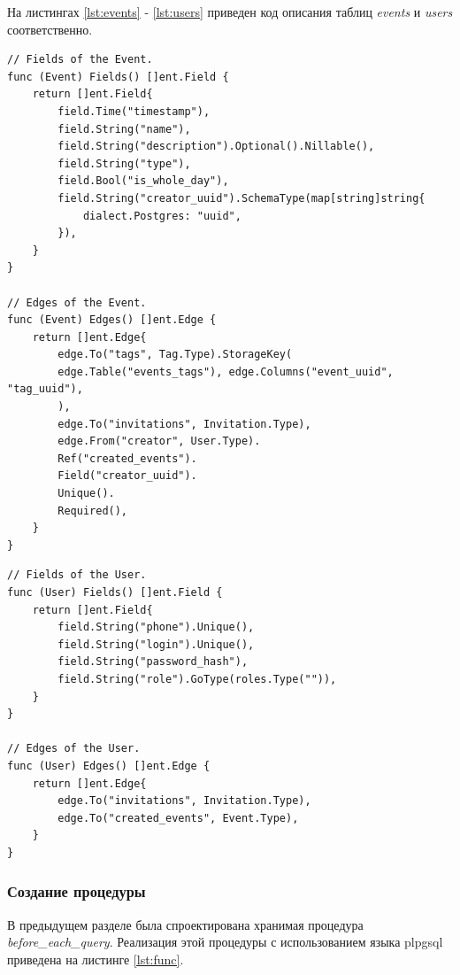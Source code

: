 На листингах \ref{lst:events} - \ref{lst:users} приведен код описания таблиц \textit{events} и \textit{users} соответственно.

\begin{center}
\captionsetup{justification=raggedright,singlelinecheck=off}
\begin{lstlisting}[label=lst:events,caption=Описание таблицы событий]
// Fields of the Event.
func (Event) Fields() []ent.Field {
	return []ent.Field{
		field.Time("timestamp"),
		field.String("name"),
		field.String("description").Optional().Nillable(),
		field.String("type"),
		field.Bool("is_whole_day"),
		field.String("creator_uuid").SchemaType(map[string]string{
			dialect.Postgres: "uuid",
		}),
	}
}

// Edges of the Event.
func (Event) Edges() []ent.Edge {
	return []ent.Edge{
		edge.To("tags", Tag.Type).StorageKey(
		edge.Table("events_tags"), edge.Columns("event_uuid", "tag_uuid"),
		),
		edge.To("invitations", Invitation.Type),
		edge.From("creator", User.Type).
		Ref("created_events").
		Field("creator_uuid").
		Unique().
		Required(),
	}
}
\end{lstlisting}
\end{center}

\clearpage

\begin{center}
	\captionsetup{justification=raggedright,singlelinecheck=off}
	\begin{lstlisting}[label=lst:users,caption=Описание таблицы пользователей]
// Fields of the User.
func (User) Fields() []ent.Field {
	return []ent.Field{
		field.String("phone").Unique(),
		field.String("login").Unique(),
		field.String("password_hash"),
		field.String("role").GoType(roles.Type("")),
	}
}

// Edges of the User.
func (User) Edges() []ent.Edge {
	return []ent.Edge{
		edge.To("invitations", Invitation.Type),
		edge.To("created_events", Event.Type),
	}
}
	\end{lstlisting}
\end{center}

\subsubsection{Создание процедуры}

В предыдущем разделе была спроектирована хранимая процедура \linebreak \textit{before\_each\_query}. Реализация этой процедуры с использованием языка plpgsql приведена на листинге \ref{lst:func}.

